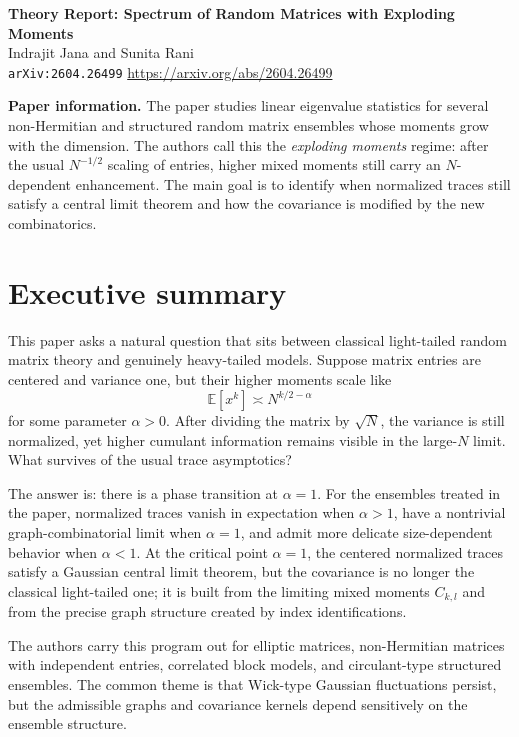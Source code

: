 \documentclass[11pt]{article}
\begin{document}
\begin{center}
{\Large \textbf{Theory Report: Spectrum of Random Matrices with Exploding Moments}}\\[0.5em]
{\large Indrajit Jana and Sunita Rani}\\[0.25em]
\texttt{arXiv:2604.26499} \quad \url{https://arxiv.org/abs/2604.26499}
\end{center}

\textbf{Paper information.} The paper studies linear eigenvalue statistics for several non-Hermitian and structured random matrix ensembles whose moments grow with the dimension. The authors call this the \emph{exploding moments} regime: after the usual $N^{-1/2}$ scaling of entries, higher mixed moments still carry an $N$-dependent enhancement. The main goal is to identify when normalized traces still satisfy a central limit theorem and how the covariance is modified by the new combinatorics.

\section*{Executive summary}
This paper asks a natural question that sits between classical light-tailed random matrix theory and genuinely heavy-tailed models. Suppose matrix entries are centered and variance one, but their higher moments scale like
\[
\mathbb E[x^k]\asymp N^{k/2-\alpha}
\]
for some parameter $\alpha>0$. After dividing the matrix by $\sqrt N$, the variance is still normalized, yet higher cumulant information remains visible in the large-$N$ limit. What survives of the usual trace asymptotics?

The answer is: there is a phase transition at $\alpha=1$. For the ensembles treated in the paper, normalized traces vanish in expectation when $\alpha>1$, have a nontrivial graph-combinatorial limit when $\alpha=1$, and admit more delicate size-dependent behavior when $\alpha<1$. At the critical point $\alpha=1$, the centered normalized traces satisfy a Gaussian central limit theorem, but the covariance is no longer the classical light-tailed one; it is built from the limiting mixed moments $C_{k,l}$ and from the precise graph structure created by index identifications.

The authors carry this program out for elliptic matrices, non-Hermitian matrices with independent entries, correlated block models, and circulant-type structured ensembles. The common theme is that Wick-type Gaussian fluctuations persist, but the admissible graphs and covariance kernels depend sensitively on the ensemble structure.
\end{document}
